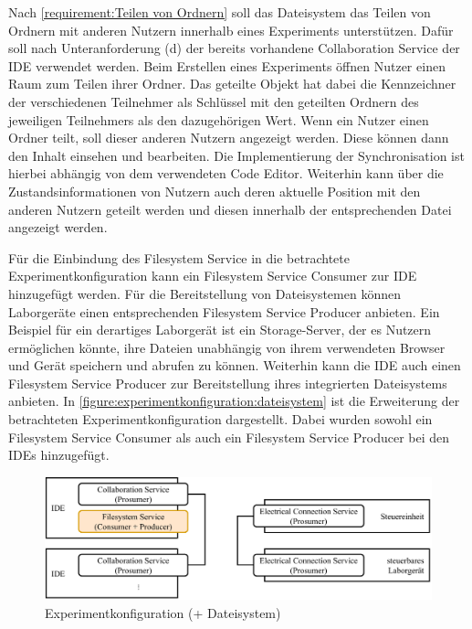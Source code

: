 Nach \autoref{requirement:Teilen von Ordnern} soll das Dateisystem das Teilen von Ordnern mit anderen Nutzern innerhalb eines Experiments unterstützen. Dafür soll nach Unteranforderung (d) der bereits vorhandene Collaboration Service der IDE verwendet werden. Beim Erstellen eines Experiments öffnen Nutzer einen Raum zum Teilen ihrer Ordner. Das geteilte Objekt hat dabei die Kennzeichner der verschiedenen Teilnehmer als Schlüssel mit den geteilten Ordnern des jeweiligen Teilnehmers als den dazugehörigen Wert. Wenn ein Nutzer einen Ordner teilt, soll dieser anderen Nutzern angezeigt werden. Diese können dann den Inhalt einsehen und bearbeiten. Die Implementierung der Synchronisation ist hierbei abhängig von dem verwendeten Code Editor. Weiterhin kann über die Zustandsinformationen von Nutzern auch deren aktuelle Position mit den anderen Nutzern geteilt werden und diesen innerhalb der entsprechenden Datei angezeigt werden.

Für die Einbindung des Filesystem Service in die betrachtete Experimentkonfiguration kann ein Filesystem Service Consumer zur IDE hinzugefügt werden. Für die Bereitstellung von Dateisystemen können Laborgeräte einen entsprechenden Filesystem Service Producer anbieten. Ein Beispiel für ein derartiges Laborgerät ist ein Storage-Server, der es Nutzern ermöglichen könnte, ihre Dateien unabhängig von ihrem verwendeten Browser und Gerät speichern und abrufen zu können. Weiterhin kann die IDE auch einen Filesystem Service Producer zur Bereitstellung ihres integrierten Dateisystems anbieten. In \autoref{figure:experimentkonfiguration:dateisystem} ist die Erweiterung der betrachteten Experimentkonfiguration dargestellt. Dabei wurden sowohl ein Filesystem Service Consumer als auch ein Filesystem Service Producer bei den IDEs hinzugefügt.

\begin{figure}[tbp]
    \centering
    \includegraphics[width=\textwidth]{diagrams/experimentkonfigurationen/Experimentkonfiguration-02.drawio.pdf}
    \caption{Experimentkonfiguration (+ Dateisystem)}
    \label{figure:experimentkonfiguration:dateisystem}
\end{figure}